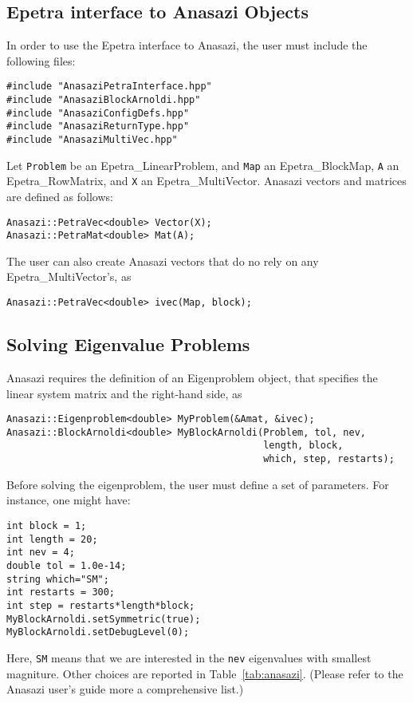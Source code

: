 
\subsection{Epetra interface to Anasazi Objects}
\label{sec:anasazi_interface}

In order to use the Epetra interface to Anasazi, the user must include
the following files:
\begin{verbatim}
#include "AnasaziPetraInterface.hpp"
#include "AnasaziBlockArnoldi.hpp"
#include "AnasaziConfigDefs.hpp"
#include "AnasaziReturnType.hpp"
#include "AnasaziMultiVec.hpp"
\end{verbatim}
Let \verb!Problem! be an Epetra\_LinearProblem, and \verb!Map! an
Epetra\_BlockMap, \verb!A! an Epetra\_RowMatrix, and \verb!X! an
Epetra\_MultiVector. Anasazi vectors and matrices are defined as
follows:
\begin{verbatim}
Anasazi::PetraVec<double> Vector(X);
Anasazi::PetraMat<double> Mat(A);
\end{verbatim}
The user can also create Anasazi vectors that do no rely on any
Epetra\_MultiVector's, as
\begin{verbatim}
Anasazi::PetraVec<double> ivec(Map, block);
\end{verbatim}


\subsection{Solving Eigenvalue Problems}
\label{sec:anasazi_solver}

Anasazi requires the definition of an Eigenproblem object, that
specifies the linear system matrix and the right-hand side, as
\begin{verbatim}
Anasazi::Eigenproblem<double> MyProblem(&Amat, &ivec);
Anasazi::BlockArnoldi<double> MyBlockArnoldi(Problem, tol, nev, 
                                             length, block, 
                                             which, step, restarts);
\end{verbatim}
Before solving the eigenproblem, the user must define a set of
parameters. For instance, one might have:
\begin{verbatim}
int block = 1;
int length = 20;
int nev = 4;
double tol = 1.0e-14;
string which="SM";
int restarts = 300;
int step = restarts*length*block;
MyBlockArnoldi.setSymmetric(true);
MyBlockArnoldi.setDebugLevel(0);
\end{verbatim}
Here, \verb!SM! means that we are interested in the \verb!nev!
eigenvalues with smallest magniture. Other choices are reported in
Table~\ref{tab:anasazi}. (Please refer to the Anasazi user's guide more
a comprehensive list.)


